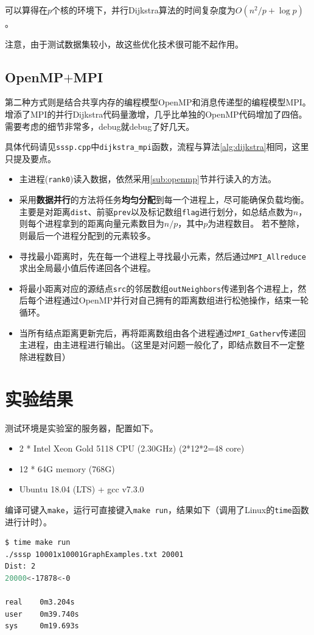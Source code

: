 \documentclass[reportComp]{thesis}
\begin{document}
可以算得在$p$个核的环境下，并行Dijkstra算法的时间复杂度为$O(n^2/p+\log p)$。

注意，由于测试数据集较小，故这些优化技术很可能不起作用。

\subsection{OpenMP$+$MPI}
第二种方式则是结合共享内存的编程模型OpenMP和消息传递型的编程模型MPI。
增添了MPI的并行Dijkstra代码量激增，几乎比单独的OpenMP代码增加了四倍。
需要考虑的细节非常多，debug就debug了好几天。

具体代码请见\verb'sssp.cpp'中\verb'dijkstra_mpi'函数，流程与算法\ref{alg:dijkstra}相同，这里只提及要点。
\begin{itemize}
	\item 主进程(\verb'rank0')读入数据，依然采用\ref{sub:openmp}节并行读入的方法。
	\item 采用\textbf{数据并行}的方法将任务\textbf{均匀分配}到每一个进程上，尽可能确保负载均衡。
	主要是对距离\verb'dist'、前驱\verb'prev'以及标记数组\verb'flag'进行划分，如总结点数为$n$，则每个进程拿到的距离向量元素数目为$n/p$，其中$p$为进程数目。
	若不整除，则最后一个进程分配到的元素较多。
	\item 寻找最小距离时，先在每一个进程上寻找最小元素，然后通过\verb'MPI_Allreduce'求出全局最小值后传递回各个进程。
	\item 将最小距离对应的源结点\verb'src'的邻居数组\verb'outNeighbors'传递到各个进程上，然后每个进程通过OpenMP并行对自己拥有的距离数组进行松弛操作，结束一轮循环。
	\item 当所有结点距离更新完后，再将距离数组由各个进程通过\verb'MPI_Gatherv'传递回主进程，由主进程进行输出。（这里是对问题一般化了，即结点数目不一定整除进程数目）
\end{itemize}

\section{实验结果}
测试环境是实验室的服务器，配置如下。
\begin{itemize}
	\item 2 * Intel Xeon Gold 5118 CPU (2.30GHz) (2*12*2=48 core)
	\item 12 * 64G memory (768G)
	\item Ubuntu 18.04 (LTS) + gcc v7.3.0
\end{itemize}

编译可键入\verb'make'，运行可直接键入\verb'make run'，结果如下（调用了Linux的\verb'time'函数进行计时）。
\begin{lstlisting}[language=bash]
$ time make run
./sssp 10001x10001GraphExamples.txt 20001
Dist: 2
20000<-17878<-0

real    0m3.204s
user    0m39.740s
sys     0m19.693s
\end{lstlisting}
\end{document}
